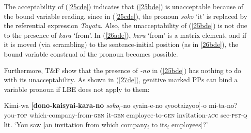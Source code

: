 \documentclass[output=paper]{langscibook}
\begin{document}
The acceptability of (\ref{25cde}) indicates that (\ref{25bde}) is unacceptable because of the bound variable reading, since in (\ref{25cde}), the pronoun \textit{soko} ‘it’ is replaced by the referential expression \textit{Toyota}. Also, the unacceptability of (\ref{25bde}) is not due to the presence of \textit{kara} ‘from’. In (\ref{26ade}), \textit{kara} ‘from’ is a matrix element, and if it is moved (via scrambling) to the sentence-initial position (as in \ref{26bde}), the bound variable construal of the pronoun becomes possible.

\begin{exe}
\ex \label{26de}
\begin{xlist}



\end{xlist}
\end{exe}

Furthermore, T\&F show that the presence of \textit{-no} in (\ref{25bde}) has nothing to do with its unacceptability. As shown in (\ref{27de}), genitive marked PPs can bind a variable pronoun if LBE does not apply to them: 

\begin{exe}
\ex \label{27de}
\gll Kimi-wa \textbf{[dono-kaisyai-kara-no} \textit{soko}$_{i}$-no syain-e-no syootaizyoo]-o mi-ta-no?\\
you-\textsc{top} which-company-from-\textsc{gen} it-\textsc{gen} employee-to-\textsc{gen} invitation-\textsc{acc} see-\textsc{pst}-\textsc{q}\\
\glt lit. ‘You saw [an invitation from which company$_{i}$ to its$_{i}$ employees]?’
\end{exe}
\end{document}
